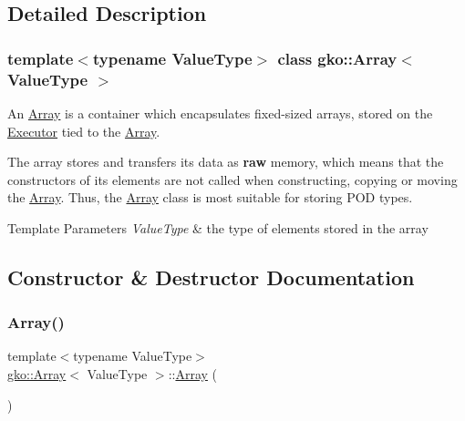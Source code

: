 \subsection{Detailed Description}
\subsubsection*{template$<$typename Value\+Type$>$\newline
class gko\+::\+Array$<$ Value\+Type $>$}

An \hyperlink{classgko_1_1Array}{Array} is a container which encapsulates fixed-\/sized arrays, stored on the \hyperlink{classgko_1_1Executor}{Executor} tied to the \hyperlink{classgko_1_1Array}{Array}. 

The array stores and transfers its data as {\bfseries raw} memory, which means that the constructors of its elements are not called when constructing, copying or moving the \hyperlink{classgko_1_1Array}{Array}. Thus, the \hyperlink{classgko_1_1Array}{Array} class is most suitable for storing P\+OD types.


\begin{DoxyTemplParams}{Template Parameters}
{\em Value\+Type} & the type of elements stored in the array \\
\hline
\end{DoxyTemplParams}


\subsection{Constructor \& Destructor Documentation}
\mbox{\label{classgko_1_1Array_a6048d48c206e8dcae55e776b7adba06a}} 
\subsubsection{\texorpdfstring{Array()}{Array()}\hspace{0.1cm}{\footnotesize\ttfamily [1/11]}}
{\footnotesize\ttfamily template$<$typename Value\+Type$>$ \\
\hyperlink{classgko_1_1Array}{gko\+::\+Array}$<$ Value\+Type $>$\+::\hyperlink{classgko_1_1Array}{Array} (\begin{DoxyParamCaption}{ }\end{DoxyParamCaption})\hspace{0.3cm}{\ttfamily [noexcept]}}



